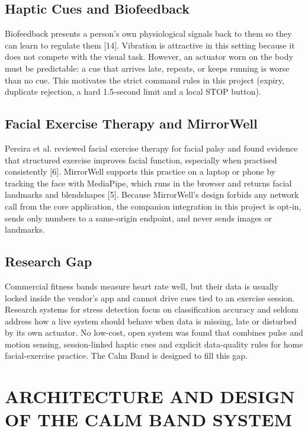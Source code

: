 \documentclass[12pt,letterpaper,oneside]{report}
\begin{document}
\section{Haptic Cues and Biofeedback}\label{sec:2.5}

Biofeedback presents a person's own physiological signals back to them so they can learn to regulate them [14]. Vibration is attractive in this setting because it does not compete with the visual task. However, an actuator worn on the body must be predictable: a cue that arrives late, repeats, or keeps running is worse than no cue. This motivates the strict command rules in this project (expiry, duplicate rejection, a hard 1.5-second limit and a local STOP button).


\section{Facial Exercise Therapy and MirrorWell}\label{sec:2.6}

Pereira et al. reviewed facial exercise therapy for facial palsy and found evidence that structured exercise improves facial function, especially when practised consistently [6]. MirrorWell supports this practice on a laptop or phone by tracking the face with MediaPipe, which runs in the browser and returns facial landmarks and blendshapes [5]. Because MirrorWell's design forbids any network call from the core application, the companion integration in this project is opt-in, sends only numbers to a same-origin endpoint, and never sends images or landmarks.


\section{Research Gap}\label{sec:2.7}

Commercial fitness bands measure heart rate well, but their data is usually locked inside the vendor's app and cannot drive cues tied to an exercise session. Research systems for stress detection focus on classification accuracy and seldom address how a live system should behave when data is missing, late or disturbed by its own actuator. No low-cost, open system was found that combines pulse and motion sensing, session-linked haptic cues and explicit data-quality rules for home facial-exercise practice. The Calm Band is designed to fill this gap.


\chapter{ARCHITECTURE AND DESIGN OF THE CALM BAND SYSTEM}\label{ch:3}
\end{document}
